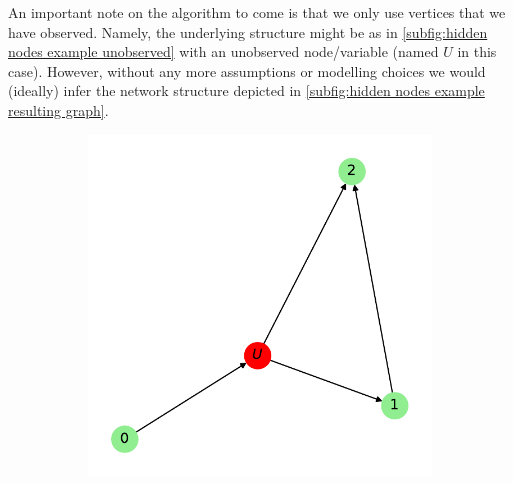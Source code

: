 \documentclass[../Thesis.tex]{subfiles}
\begin{document}
An important note on the algorithm to come is that we only use vertices that we have observed. Namely, the underlying structure might be as in \autoref{subfig:hidden nodes example unobserved} with an unobserved node/variable (named $U$ in this case). However, without any more assumptions or modelling choices we would (ideally) infer the network structure depicted in \autoref{subfig:hidden nodes example resulting graph}.
\begin{figure}[h]
    \centering
    \begin{subfigure}[t]{0.49\textwidth}
        \centering
        \includegraphics[width=\linewidth]{figures/ND examples/Hidden nodes/graph example w hidden.pdf}
        \caption{}
        \label{subfig:hidden nodes example unobserved}
    \end{subfigure}
    \begin{subfigure}[t]{0.49\textwidth}
        \centering

\end{subfigure}
\end{figure}
\end{document}
